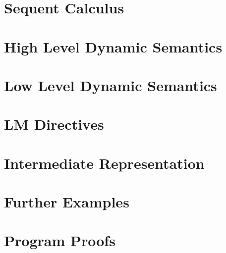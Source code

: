 \chapter{Sequent Calculus}\label{sec:fragment}


\chapter{High Level Dynamic Semantics}\label{sec:hld}


\chapter{Low Level Dynamic Semantics}\label{sec:lld}


\chapter{LM Directives}


\chapter{Intermediate Representation}\label{appendix:vm}

\chapter{Further Examples}

\chapter{Program Proofs}

